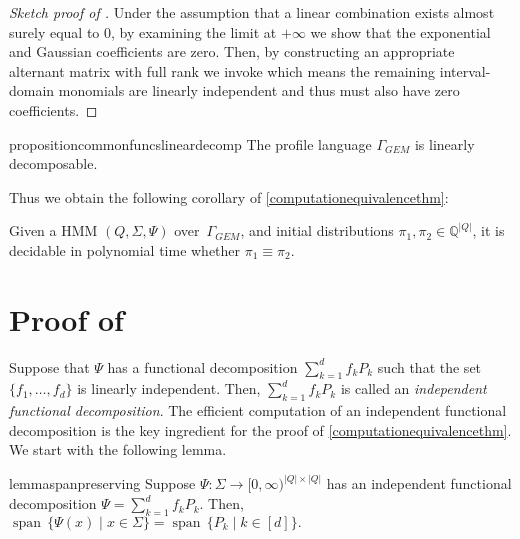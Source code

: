 \documentclass[a4paper,UKenglish,cleveref, autoref,mathscr]{lipics-v2019}
\newcommand{\QQ}{\mathbb{Q}}
\newcommand{\1}{\mathbbm{1}}
\newcommand{\pl}{\Gamma_{\mathit{GEM}}}
\DeclareMathOperator{\Span}{span\,}
\begin{document}
\begin{proof}[Sketch proof of ]
Under the assumption that a linear combination exists almost surely equal to $0$, by examining the limit at $+\infty$ we show that the exponential and Gaussian coefficients are zero. Then, by constructing an appropriate alternant matrix with full rank we invoke  which means the remaining interval-domain monomials are linearly independent and thus must also have zero coefficients.
\end{proof}

\begin{restatable}{proposition}{commonfuncslineardecomp}\label{commonfuncslineardecomp}
The profile language $\pl$ is linearly decomposable.
\end{restatable} 

Thus we obtain the following corollary of \cref{computationequivalencethm}:
\begin{corollary}
Given a HMM $(Q, \Sigma, \Psi)$ over~$\pl$, and initial distributions $\pi_1, \pi_2 \in \QQ^{|Q|}$, it is decidable in polynomial time whether $\pi_1 \equiv \pi_2$.
\end{corollary}




\section{Proof of }\label{starredsec}

Suppose that $\Psi$ has a functional decomposition $\sum_{k = 1}^d f_k P_k$ such that the set $\{f_1, \dots, f_d\}$ is linearly independent. Then, $\sum_{k = 1}^d f_k P_k$ is called an \emph{independent functional decomposition}.
The efficient computation of an independent functional decomposition is the key ingredient for the proof of \cref{computationequivalencethm}. 
We start with the following lemma.

\begin{restatable}{lemma}{spanpreserving}\label{spanpreserving}
Suppose $\Psi : \Sigma \rightarrow [0,\infty)^{|Q| \times |Q|}$ has an independent functional decomposition $\Psi = \sum_{k = 1}^d f_k P_k$. Then, $\Span \{\Psi(x) \mid x \in \Sigma\} = \Span \{P_k \mid k \in [d]\}.$
\end{restatable}
\end{document}
